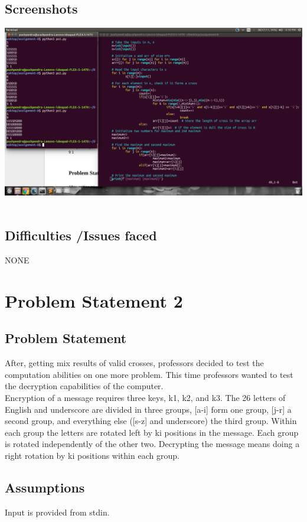 \documentclass[12pt]{article}
\begin{document}
{\subsection{Screenshots}
\includegraphics[scale=0.25]{ss1}
\\ \\
\subsection{Difficulties /Issues faced}
NONE
\\
\pagebreak
\section{Problem Statement 2}

{
	\subsection{Problem Statement}{
	After, getting mix results of valid crosses, professors decided to test the computation abilities on one more problem. This time professors wanted to test the decryption capabilities of the computer.\\
	Encryption of  a message requires three keys, k1, k2, and k3. The 26 letters of English and underscore are divided in three groups,  [a-i] form one group, [j-r] a second group, and everything else ([s-z] and underscore) the third group. Within each group the letters are rotated left by ki positions in the message. Each group is rotated independently of the other two. Decrypting the message means doing a right rotation by ki positions within each group.
	\cite{ref2}
	}	
	
	\subsection{Assumptions}
	{
		Input is provided from stdin.
	}
	
}}
\end{document}
